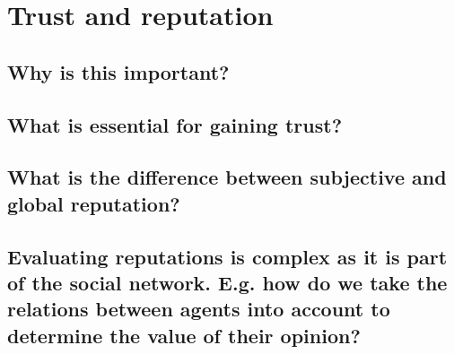 \section{Trust and reputation}
\subsection{Why is this important?}
\subsection{What is essential for gaining trust?}
\subsection{What is the difference between subjective and global reputation?}
\subsection{Evaluating reputations is complex as it is part of the social network. E.g. how do we take the relations between agents into account to determine the value of their opinion?}
